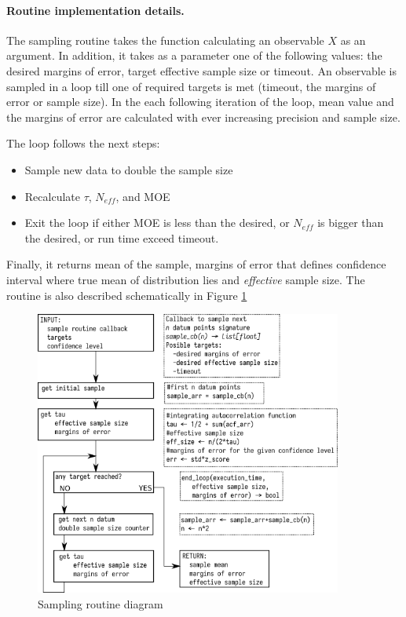 \documentclass[journal=mamobx, layout=twocolumns,manuscript=article]{achemso}
\begin{document}
\paragraph{Routine implementation details.}

The sampling routine takes the function calculating an observable $X$ as an argument. 
In addition, it takes as a parameter one of the following values: the desired margins of error, target effective sample size or timeout.
An observable is sampled in a loop till one of required targets is met (timeout, the margins of error or sample size). 
In the each following iteration of the loop, mean value and the margins of error are calculated with ever increasing precision and sample size. 

The loop follows the next steps:
\begin{itemize}
    \item Sample new data to double the sample size
    \item Recalculate $\tau$, $N_{eff}$, and MOE
    \item Exit the loop if either MOE is less than the desired, 
    			or $N_{eff}$ is bigger than the desired, 
    			or run time exceed timeout.
\end{itemize}
Finally, it returns mean of the sample, margins of error that defines confidence interval where true mean of distribution lies and \emph{effective} sample size. 
The routine is also described schematically in Figure \ref{fig: sampling_diagram}

\begin{figure}[t]
\includegraphics[width = 0.9\textwidth]{figures/sample_to_target_scheme.png}
\caption{Sampling routine diagram}
\label{fig: sampling_diagram}
\end{figure}


\end{document}
